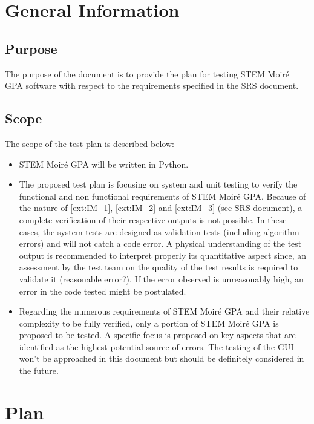 \documentclass[12pt, titlepage]{article}
\newcommand{\progname}{STEM Moir{\'e} GPA}
\begin{document}


\section{General Information}

\subsection{Purpose}

The purpose of the document is to provide the plan for testing \progname{} software with respect to the requirements specified in the SRS document. 

\subsection{Scope}

The scope of the test plan is described below:
\begin{itemize}
\item \progname{} will be written in Python.
\item The proposed test plan is focusing on system and unit testing to verify the functional and non functional requirements of \progname{}. Because of the nature of \cref{ext:IM_1}, \cref{ext:IM_2} and \cref{ext:IM_3} (see SRS document), a complete verification of their respective outputs is not possible. In these cases, the system tests are designed as validation tests (including algorithm errors) and will not catch a code error. A physical understanding of the test output is recommended to interpret properly its quantitative aspect since, an assessment by the test team on the quality of the test results is required to validate it (reasonable error?). If the error observed is unreasonably high, an error in the code tested might be postulated.
\item Regarding the numerous requirements of \progname{} and their relative complexity to be fully verified, only a portion of \progname{} is proposed to be tested. A specific focus is proposed on key aspects that are identified as the highest potential source of errors. The testing of the GUI won't be approached in this document but should be definitely considered in the future.
\end{itemize}

\section{Plan}
\end{document}
